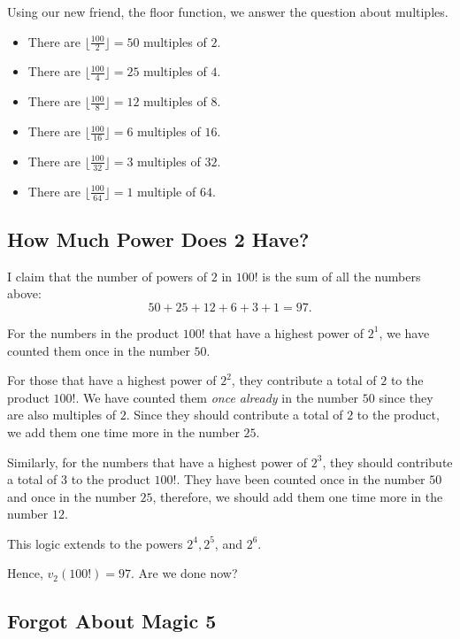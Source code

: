 \clearpage

Using our new friend, the floor function, we answer the question about multiples.
\begin{itemize}  
	\item  There are $\lfloor \frac{100}{2} \rfloor=50$ multiples of $2$.
	\item  There are $\lfloor \frac{100}{4} \rfloor=25$ multiples of $4$.
	\item  There are $\lfloor \frac{100}{8} \rfloor=12$ multiples of $8$.
	\item  There are $\lfloor \frac{100}{16} \rfloor=6$ multiples of $16$.
	\item  There are $\lfloor \frac{100}{32} \rfloor=3$ multiples of $32$.
	\item  There are $\lfloor \frac{100}{64} \rfloor=1$ multiple of $64$.  
\end{itemize}

\subsection*{How Much Power Does 2 Have?}

I claim that the number of powers of $2$ in $100!$ is the sum of all the numbers above: $$50+25+12+6+3+1=97.$$  

For the numbers in the product $100!$ that have a highest power of $2^{1}$, we have counted them once in the number $50$. 

For those that have a highest power of $2^{2}$, they contribute a total of $2$ to the product $100!$. We have counted them \textit{once already} in the number $50$ since they are also multiples of $2$. Since they should contribute a total of $2$ to the product, we add them one time more in the number $25$.  
\clearpage

Similarly, for the numbers that have a highest power of $2^3$, they should contribute a total of $3$ to the product $100!$. They have been counted once in the number $50$ and once in the number $25$, therefore, we should add them one time more in the number $12$.

This logic extends to the powers $2^4, 2^5$, and $2^6$.  

Hence, $v_2(100!)=97$.  Are we done now?

\clearpage

\subsection*{Forgot About Magic 5}

